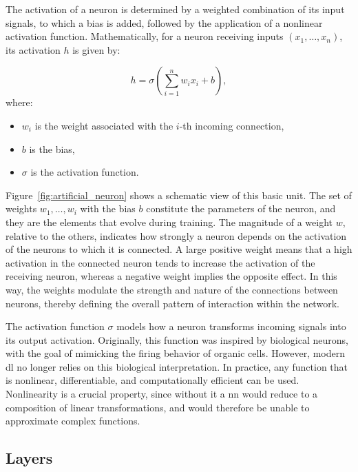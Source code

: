 The activation of a neuron is determined by a weighted combination of its input signals, to which a bias is added, followed by the application of a nonlinear activation function.
Mathematically, for a neuron receiving inputs $(x_1, \dots, x_n)$, its activation $h$ is given by:
\begin{equationwhere}
\begin{equation}
h = \sigma\left(\sum_{i=1}^{n} w_i x_i + b\right),
\label{eq:neuron_activation}
\end{equation}
where:
\begin{itemize}
\item $w_i$ is the weight associated with the $i$-th incoming connection,
\item $b$ is the bias,
\item $\sigma$ is the activation function.
\end{itemize}
\end{equationwhere}

Figure~\ref{fig:artificial_neuron} shows a schematic view of this basic unit.
The set of weights $w_1, \dots, w_i$ with the bias $b$ constitute the parameters of the neuron, and they are the elements that evolve during training.
The magnitude of a weight $w$, relative to the others, indicates how strongly a neuron depends on the activation of the neurons to which it is connected.
A large positive weight means that a high activation in the connected neuron tends to increase the activation of the receiving neuron, whereas a negative weight implies the opposite effect.
In this way, the weights modulate the strength and nature of the connections between neurons, thereby defining the overall pattern of interaction within the network.



The activation function $\sigma$ models how a neuron transforms incoming signals into its output activation.
Originally, this function was inspired by biological neurons, with the goal of mimicking the firing behavior of organic cells.
However, modern \gls{dl} no longer relies on this biological interpretation.
In practice, any function that is nonlinear, differentiable, and computationally efficient can be used.
Nonlinearity is a crucial property, since without it a \gls{nn} would reduce to a composition of linear transformations, and would therefore be unable to approximate complex functions.

\subsection{Layers}

